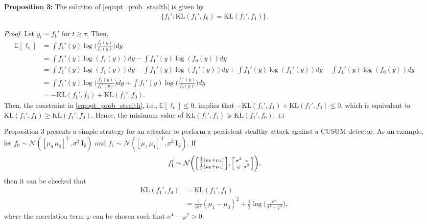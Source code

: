 \documentclass[onecolumn]{IEEEtran}
\begin{document}
\textbf{Proposition 3:} The solution of \eqref{eq:opt_prob_stealth} is given by
\begin{gather}\label{eq:cond_pers}
\{f_1': \mathrm{KL}(f_1',f_0) = \mathrm{KL}(f_1',f_1)\}.
\end{gather}

\begin{proof}
Let $y_t \sim f_1'$ for $t \geq \tau$. Then,
\begin{align} \nonumber
\mathbb{E}[\ell_t] &= \int {f_1'(y) \log\Big(\frac{f_1(y)}{f_0(y)}\Big) dy} \\  \nonumber
 &= \int {f_1'(y) \log(f_1(y)) dy} - \int {f_1'(y) \log(f_0(y)) dy} \\  \nonumber
 &= \int {f_1'(y) \log(f_1(y)) dy} - \int {f_1'(y) \log(f_1'(y)) dy} + \int {f_1'(y) \log(f_1'(y)) dy} - \int {f_1'(y) \log(f_0(y)) dy} \\  \nonumber
 &= \int {f_1'(y) \log\Big(\frac{f_1(y)}{f_1'(y)}\Big) dy} + \int {f_1'(y) \log\Big(\frac{f_1'(y)}{f_0(y)}\Big) dy} \\  \nonumber
 &= - \mathrm{KL}(f_1',f_1) + \mathrm{KL}(f_1',f_0).
\end{align}
Then, the constraint in \eqref{eq:opt_prob_stealth}, i.e., $\mathbb{E}[\ell_t] \leq 0$,  implies that $- \mathrm{KL}(f_1',f_1) + \mathrm{KL}(f_1',f_0) \leq 0$, which is equivalent to
$\mathrm{KL}(f_1',f_1) \geq \mathrm{KL}(f_1',f_0)$. Hence, the minimum value of $\mathrm{KL}(f_1',f_1)$ is $\mathrm{KL}(f_1',f_0)$.
\end{proof}

Proposition 3 presents a simple strategy for an attacker to perform a persistent stealthy attack against a CUSUM detector. As an example, let $f_0 \sim \mathcal{N}([\mu_0 \, \mu_0]^\mathrm{T},\sigma^2 \, \mathbf{I}_2)$ and $f_1 \sim \mathcal{N}([\mu_1 \, \mu_1]^\mathrm{T},\sigma^2 \, \mathbf{I}_2)$. If
\begin{gather}\nonumber
f_1' \sim \mathcal{N}\bigg(
\begin{bsmallmatrix}
  \frac{1}{2} (\mu_0 + \mu_1) \\
  \frac{1}{2} (\mu_0 + \mu_1)
\end{bsmallmatrix},
\begin{bsmallmatrix}
  \sigma^2 & \varphi \\
  \varphi & \sigma^2
\end{bsmallmatrix}\bigg),
\end{gather}
then it can be checked that
\begin{align} \nonumber
\mathrm{KL}(f_1',f_0) &= \mathrm{KL}(f_1',f_1) \\ \nonumber
&= \frac{1}{4 \sigma^2} (\mu_1 - \mu_0)^2 + \frac{1}{2} \log\Big(\frac{\sigma^4}{\sigma^4 - \varphi^2}\Big),
\end{align}
where the correlation term $\varphi$ can be chosen such that $\sigma^4 - \varphi^2 > 0$.
\end{document}
